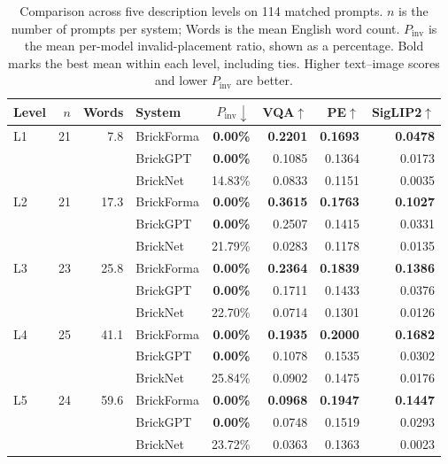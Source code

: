 \begin{table}[t]
\centering
\small
\setlength{\tabcolsep}{5pt}
\begin{tabular}{lrrlrrrr}
\toprule
Level & $n$ & Words & System & $P_{\mathrm{inv}}\downarrow$ & VQA$\uparrow$ & PE$\uparrow$ & SigLIP2$\uparrow$ \\
\midrule
L1 & 21 & 7.8 & BrickForma & \textbf{0.00\%} & \textbf{0.2201} & \textbf{0.1693} & \textbf{0.0478} \\
 & & & BrickGPT & \textbf{0.00\%} & 0.1085 & 0.1364 & 0.0173 \\
 & & & BrickNet & 14.83\% & 0.0833 & 0.1151 & 0.0035 \\
\midrule
L2 & 21 & 17.3 & BrickForma & \textbf{0.00\%} & \textbf{0.3615} & \textbf{0.1763} & \textbf{0.1027} \\
 & & & BrickGPT & \textbf{0.00\%} & 0.2507 & 0.1415 & 0.0331 \\
 & & & BrickNet & 21.79\% & 0.0283 & 0.1178 & 0.0135 \\
\midrule
L3 & 23 & 25.8 & BrickForma & \textbf{0.00\%} & \textbf{0.2364} & \textbf{0.1839} & \textbf{0.1386} \\
 & & & BrickGPT & \textbf{0.00\%} & 0.1711 & 0.1433 & 0.0376 \\
 & & & BrickNet & 22.70\% & 0.0714 & 0.1301 & 0.0126 \\
\midrule
L4 & 25 & 41.1 & BrickForma & \textbf{0.00\%} & \textbf{0.1935} & \textbf{0.2000} & \textbf{0.1682} \\
 & & & BrickGPT & \textbf{0.00\%} & 0.1078 & 0.1535 & 0.0302 \\
 & & & BrickNet & 25.84\% & 0.0902 & 0.1475 & 0.0176 \\
\midrule
L5 & 24 & 59.6 & BrickForma & \textbf{0.00\%} & \textbf{0.0968} & \textbf{0.1947} & \textbf{0.1447} \\
 & & & BrickGPT & \textbf{0.00\%} & 0.0748 & 0.1519 & 0.0293 \\
 & & & BrickNet & 23.72\% & 0.0363 & 0.1363 & 0.0023 \\
\bottomrule
\end{tabular}
\caption{Comparison across five description levels on 114 matched prompts. $n$ is the number of prompts per system; Words is the mean English word count. $P_{\mathrm{inv}}$ is the mean per-model invalid-placement ratio, shown as a percentage. Bold marks the best mean within each level, including ties. Higher text--image scores and lower $P_{\mathrm{inv}}$ are better.}
\label{tab:level-results}
\end{table}
